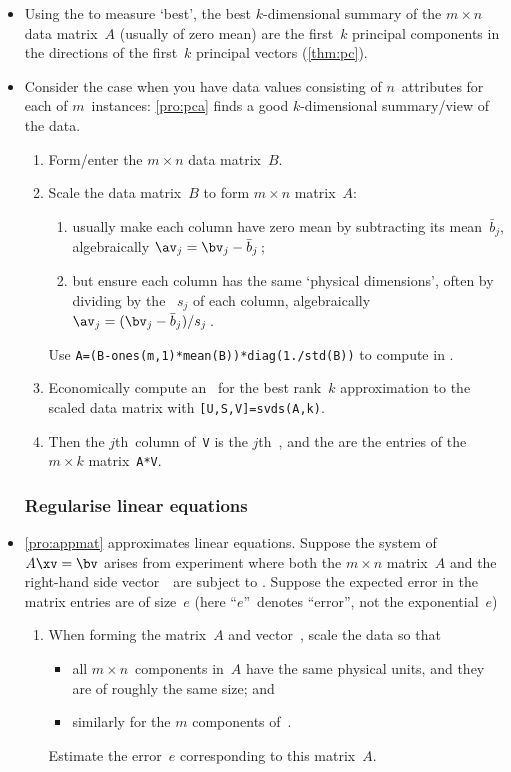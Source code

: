 \begin{itemize}
\item Using the  to measure `best', the best \(k\)-dimensional summary of the \(m\times n\) data matrix~\(A\) (usually of zero mean) are the first~\(k\) principal components in the directions of the first~\(k\) principal vectors (\autoref{thm:pc}).

\item  
Consider the case when you have data values consisting of \(n\)~attributes for each of \(m\)~instances: \autoref{pro:pca} finds a good \(k\)-dimensional summary\slash view of the data. 
\begin{enumerate} \sloppy
\item Form\slash enter the \(m\times n\) data matrix~\(B\).
\item {}Scale the data matrix~\(B\) to form \(m\times n\) matrix~\(A\):
\begin{enumerate}
\item usually make each column have zero mean by subtracting its mean~\(\bar b_j\), algebraically \(\av_j=\bv_j-\bar b_j\)\,;
\item but ensure each column has the same `physical dimensions', often by dividing by the ~\(s_j\) of each column, algebraically \(\av_j=(\bv_j-\bar b_j)/s_j\)\,.
\end{enumerate}
Use \verb|A=(B-ones(m,1)*mean(B))*diag(1./std(B))| to compute in \script.
\item  Economically compute an \svd\ for the best rank~\(k\) approximation to the scaled data matrix with \verb|[U,S,V]=svds(A,k)|.
\item Then the \(j\)th~column of~\verb|V| is the \(j\)th~, and the  are the entries of the \(m\times k\) matrix~\verb|A*V|.
\end{enumerate}




\subsubsection*{Regularise linear equations}

\item \autoref{pro:appmat} approximates linear equations.
Suppose the system of  \(A\xv=\bv\) arises from experiment where both the \(m\times n\) matrix~\(A\) and the right-hand side vector~\bv\ are subject to .  
Suppose the expected error in the matrix entries are of size~\(e\) (here ``\(e\)''~denotes ``error'', not the exponential~\(e\))
\begin{enumerate}
\item When forming the matrix~\(A\) and vector~\bv, scale the data so that 
\begin{itemize}
\item all \(m\times n\)~components in~\(A\) have the same physical units, and they are of roughly the same size; and
\item similarly for the \(m\) components of~\bv.
\end{itemize}
Estimate the error~\(e\) corresponding to this matrix~\(A\).
 

\end{enumerate}
\end{itemize}
